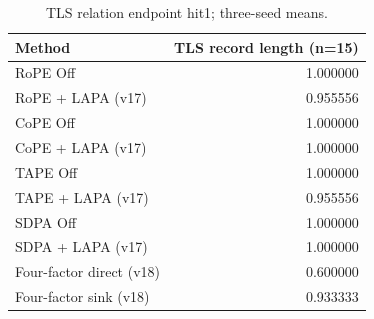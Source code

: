 \begin{table}[t]
\centering
\scriptsize
\caption{TLS relation endpoint hit1; three-seed means.}
\begin{tabular}{lr}
\toprule
Method & TLS record length (n=15) \\
\midrule
RoPE Off & 1.000000 \\
RoPE + LAPA (v17) & 0.955556 \\
CoPE Off & 1.000000 \\
CoPE + LAPA (v17) & 1.000000 \\
TAPE Off & 1.000000 \\
TAPE + LAPA (v17) & 0.955556 \\
SDPA Off & 1.000000 \\
SDPA + LAPA (v17) & 1.000000 \\
Four-factor direct (v18) & 0.600000 \\
Four-factor sink (v18) & 0.933333 \\
\bottomrule
\end{tabular}
\end{table}
